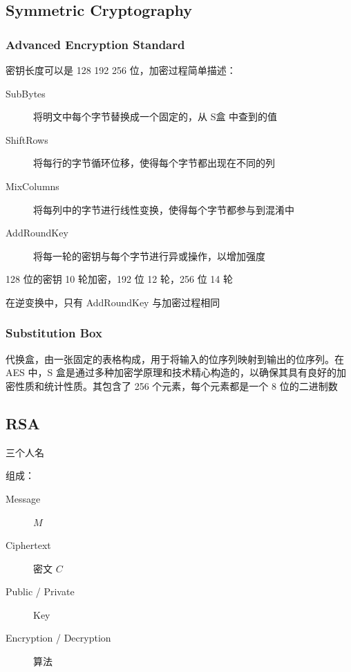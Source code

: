 \documentclass[11pt,journal,compsoc]{IEEEtran}
\begin{document}
\subsection{Symmetric Cryptography}


\subsubsection{Advanced Encryption Standard}

密钥长度可以是 128 192 256 位，加密过程简单描述：

\begin{description}
    \item[SubBytes] 将明文中每个字节替换成一个固定的，从 S盒 中查到的值
    
    \item[ShiftRows] 将每行的字节循环位移，使得每个字节都出现在不同的列

    \item[MixColumns] 将每列中的字节进行线性变换，使得每个字节都参与到混淆中

    \item[AddRoundKey] 将每一轮的密钥与每个字节进行异或操作，以增加强度
\end{description}

128 位的密钥 10 轮加密，192 位 12 轮，256 位 14 轮

在逆变换中，只有 AddRoundKey 与加密过程相同


\subsubsection{Substitution Box}

代换盒，由一张固定的表格构成，用于将输入的位序列映射到输出的位序列。在 AES 中，S 盒是通过多种加密学原理和技术精心构造的，以确保其具有良好的加密性质和统计性质。其包含了 256 个元素，每个元素都是一个 8 位的二进制数


\subsection{RSA}

三个人名

组成：

\begin{description}
    \item[Message] $M$

    \item[Ciphertext] 密文 $C$

    \item[Public / Private] Key

    \item[Encryption / Decryption] 算法
\end{description}
\end{document}

